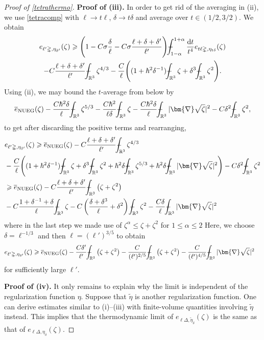 \documentclass[final,onefignum,onetabnum,reqno]{amsart}
\theoremstyle{remark}
\renewcommand{\le}{\leqslant}
\renewcommand{\ge}{\geqslant}
\newcommand{\ol}[1]{\overline{#1}}
\newcommand{\wt}[1]{\widetilde{#1}}
\newcommand{\RR}{\mathbb{R}}
\newcommand{\NUEG}{\mathrm{NUEG}} %
\newcommand{\grad}{\bm{\nabla}} %
\newcommand{\tetra}{\mathbb{\Delta}} %
\newcommand{\dd}{\mathrm{d}} %
\def\Xint#1{\mathchoice
{\XXint\displaystyle\textstyle{#1}}%
{\XXint\textstyle\scriptstyle{#1}}%
{\XXint\scriptstyle\scriptscriptstyle{#1}}%
{\XXint\scriptscriptstyle\scriptscriptstyle{#1}}%
\!\int}
\def\XXint#1#2#3{{\setbox0=\hbox{$#1{#2#3}{\int}$ }
\vcenter{\hbox{$#2#3$ }}\kern-.6\wd0}}
\def\dashint{\Xint-}
\begin{document}
\begin{proof}[Proof of \cref{tetrathermo}]
\vspace{.3em}
\noindent\textbf{Proof of (iii).} In order to get rid of the averaging in (ii), we use \cref{tetracomp} with $\ell\to t\ell$, $\delta\to t\delta$ and average over $t\in(1/2,3/2)$. We obtain
\begin{multline}\label{monoavg}
e_{\ell'\tetra,\eta_{\delta'}}(\zeta)\ge \Bigg( 1-C\sigma \frac{\delta}{\ell} -C\sigma\frac{\ell+\delta+\delta'}{\ell'}\Bigg) \dashint_{1-\alpha}^{1+\alpha}\frac{\dd t}{t^4} e_{t\ell\tetra,\eta_{t\delta}}(\zeta)\\
- C \frac{\ell+\delta+\delta'}{\ell'} \dashint_{\RR^3} \zeta^{4/3}-\frac{C}{\ell}\Bigg( (1+\hbar^2\delta^{-1}) \dashint_{\RR^3} \zeta + \delta^3\dashint_{\RR^3} \zeta^2 \Bigg).
\end{multline}
Using (ii), we may bound the $t$-average from below by 
$$
\ol{e}_{\NUEG}(\zeta) -\frac{C\hbar^2\delta}{\ell} \dashint_{\RR^3}\zeta^{5/3} -  \frac{C\hbar^2}{\ell\delta} \dashint_{\RR^3} \zeta - \frac{C\hbar^2\delta}{\ell}\dashint_{\RR^3} |\grad\sqrt{\zeta}|^2 -C\delta^2\dashint_{\RR^3}\zeta^2,
$$
to get after discarding the positive terms and rearranging,
\begin{align*}
&e_{\ell'\tetra,\eta_{\delta'}}(\zeta)\ge \ol{e}_{\NUEG}(\zeta) - C\frac{\ell+\delta+\delta'}{\ell'} \dashint_{\RR^3} \zeta^{4/3} \\
&-\frac{C}{\ell}\Biggl( (1+\hbar^2\delta^{-1}) \dashint_{\RR^3} \zeta + \delta^3\dashint_{\RR^3} \zeta^2 + \hbar^2\delta \dashint_{\RR^3} \zeta^{5/3} + \hbar^2\delta \dashint_{\RR^3} |\grad\sqrt{\zeta}|^2\Biggr) - C\delta^2 \dashint_{\RR^3}\zeta^2  \\
&\ge \ol{e}_{\NUEG}(\zeta) - C\frac{\ell+\delta+\delta'}{\ell'} \dashint_{\RR^3} \left(\zeta +\zeta^2\right) \\
&-C\frac{1+\delta^{-1}+\delta}{\ell} \dashint_{\RR^3} \zeta - C\left(\frac{\delta+\delta^3}{\ell}+\delta^2 \right)\dashint_{\RR^3} \zeta^2  -\frac{C\delta}{\ell} \dashint_{\RR^3} |\grad\sqrt{\zeta}|^2
\end{align*}
where in the last step we made use of $\zeta^\alpha\le \zeta+\zeta^2$ for $1\le\alpha\le 2$
Here, we choose $\delta=\ell^{-1/3}$ and then $\ell=(\ell')^{3/5}$ to obtain
\begin{align*}
&e_{\ell'\tetra,\eta_{\delta'}}(\zeta)\ge \ol{e}_{\NUEG}(\zeta) -\frac{C\delta'}{\ell'}\dashint_{\RR^3} \left(\zeta +\zeta^2\right) -\frac{C}{(\ell')^{2/5}}\dashint_{\RR^3} \left(\zeta +\zeta^2\right) - \frac{C}{(\ell')^{4/5}}\dashint_{\RR^3} |\grad\sqrt{\zeta}|^2
\end{align*}
for sufficiently large $\ell'$.

\vspace{.3em}
\noindent\textbf{Proof of (iv).} It only remains to explain why the limit is independent of the
regularization function $\eta$. Suppose that $\wt{\eta}$ is another regularization function. 
One can derive estimates similar to (i)--(iii) with finite-volume quantities involving $\wt{\eta}$ instead.
 This implies that the thermodynamic limit of $e_{\ell\tetra,\wt{\eta}_\delta}(\zeta)$ is the same as that of $e_{\ell\tetra,\eta_\delta}(\zeta)$.
\end{proof}
\end{document}
